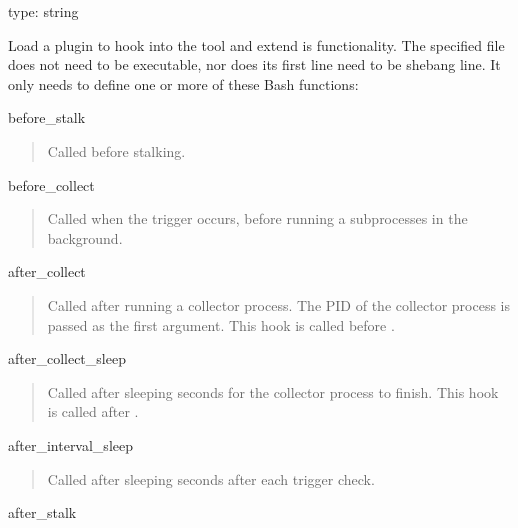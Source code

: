 \documentclass[letterpaper,10pt,english]{sphinxmanual}
\begin{document}
\begin{fulllineitems}
\label{\detokenize{mariadb-stat:cmdoption-mariadb-stat-plugin}}
type: string

Load a plugin to hook into the tool and extend is functionality.
The specified file does not need to be executable, nor does its first line
need to be shebang line.  It only needs to define one or more of these
Bash functions:

before\_stalk
\begin{quote}

Called before stalking.
\end{quote}

before\_collect
\begin{quote}

Called when the trigger occurs, before running a {\hyperref[\detokenize{mariadb-stat:cmdoption-mariadb-stat-collect}]{}}
subprocesses in the background.
\end{quote}

after\_collect
\begin{quote}

Called after running a collector process.  The PID of the collector process
is passed as the first argument.  This hook is called before
.
\end{quote}

after\_collect\_sleep
\begin{quote}

Called after sleeping {\hyperref[\detokenize{mariadb-stat:cmdoption-mariadb-stat-sleep}]{}} seconds for the collector process to finish.
This hook is called after .
\end{quote}

after\_interval\_sleep
\begin{quote}

Called after sleeping {\hyperref[\detokenize{mariadb-stat:cmdoption-mariadb-stat-interval}]{}} seconds after each trigger check.
\end{quote}

after\_stalk
\begin{quote}


\end{quote}
\end{fulllineitems}
\end{document}
